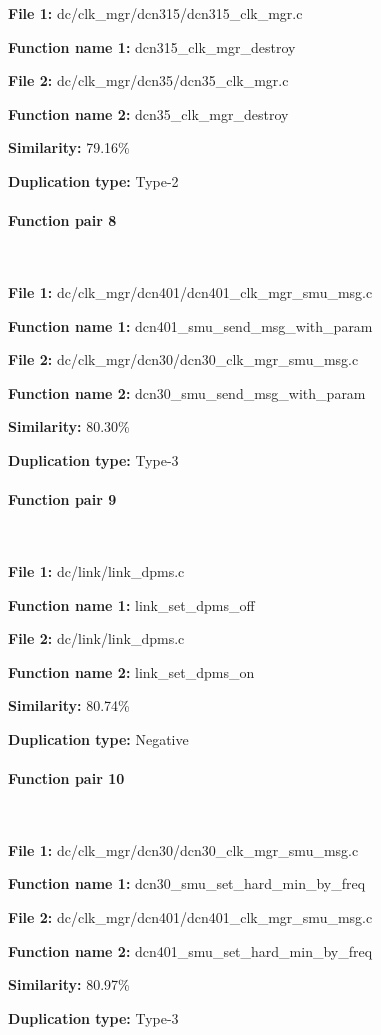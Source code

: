 \textbf{File 1:} dc/clk\_mgr/dcn315/dcn315\_clk\_mgr.c

\textbf{Function name 1:} dcn315\_clk\_mgr\_destroy

\textbf{File 2:} dc/clk\_mgr/dcn35/dcn35\_clk\_mgr.c

\textbf{Function name 2:} dcn35\_clk\_mgr\_destroy

\textbf{Similarity:} 79.16\%

\textbf{Duplication type:} Type-2


\paragraph{Function pair 8 }  

\

\textbf{File 1:} dc/clk\_mgr/dcn401/dcn401\_clk\_mgr\_smu\_msg.c

\textbf{Function name 1:} dcn401\_smu\_send\_msg\_with\_param

\textbf{File 2:} dc/clk\_mgr/dcn30/dcn30\_clk\_mgr\_smu\_msg.c

\textbf{Function name 2:} dcn30\_smu\_send\_msg\_with\_param

\textbf{Similarity:} 80.30\%

\textbf{Duplication type:} Type-3


\paragraph{Function pair 9 }  

\

\textbf{File 1:} dc/link/link\_dpms.c

\textbf{Function name 1:} link\_set\_dpms\_off

\textbf{File 2:} dc/link/link\_dpms.c

\textbf{Function name 2:} link\_set\_dpms\_on

\textbf{Similarity:} 80.74\%

\textbf{Duplication type:} Negative


\paragraph{Function pair 10 }  

\

\textbf{File 1:} dc/clk\_mgr/dcn30/dcn30\_clk\_mgr\_smu\_msg.c

\textbf{Function name 1:} dcn30\_smu\_set\_hard\_min\_by\_freq

\textbf{File 2:} dc/clk\_mgr/dcn401/dcn401\_clk\_mgr\_smu\_msg.c

\textbf{Function name 2:} dcn401\_smu\_set\_hard\_min\_by\_freq

\textbf{Similarity:} 80.97\%

\textbf{Duplication type:} Type-3




